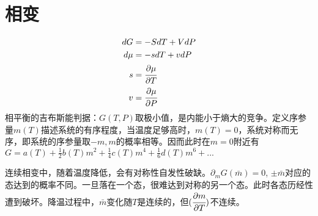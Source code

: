 \documentclass[a4paper,12pt]{article}
\newcommand{\myp}[3]{(\cfrac{\partial{#1}}{\partial{#2}})_{#3}}
\begin{document}
\section{相变}
\begin{subequations}
\begin{align*}
dG &= -S dT + V dP \\
d\mu &= -s dT + v dP \\
s &= \cfrac{\partial \mu}{\partial T} \\
v &= \cfrac{\partial \mu}{\partial P} \\
\end{align*}
\end{subequations}
相平衡的吉布斯能判据：$G(T, P)$取极小值，是内能小于熵大的竞争。定义序参量$m(T)$描述系统的有序程度，当温度足够高时，$m(T) = 0$，系统对称而无序，即系统的序参量取$-m, m$的概率相等。因而此时在$m = 0$附近有\\
$G = a(T) + \frac{1}{2}b(T)m^2 + \frac{1}{4}c(T)m^4 + \frac{1}{6}d(T)m^6 + ...$\par
连续相变中，随着温度降低，会有对称性自发性破缺。$\partial_m G(\bar{m}) = 0$, $\pm \bar{m}$对应的态达到的概率不同。一旦落在一个态，很难达到对称的另一个态。此时各态历经性遭到破坏。降温过程中，$\bar{m}$变化随$T$是连续的，但$\myp{m}{T}{}$不连续。
\end{document}
